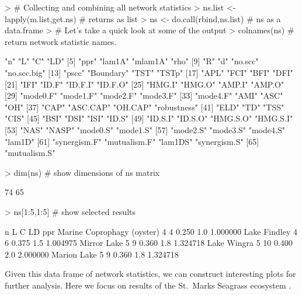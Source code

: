 \documentclass[article]{jss}
\begin{document}
\begin{Schunk}
\begin{Sinput}
> # Collecting and combining all network statistics
> ns.list <- lapply(m.list,get.ns) # returns as list
> ns <- do.call(rbind,ns.list)  # ns as a data.frame
> # Let's take a quick look at some of the output
> colnames(ns)    # return network statistic names.
\end{Sinput}
\begin{Soutput}
 [1] "n"           "L"           "C"           "LD"         
 [5] "ppr"         "lam1A"       "mlam1A"      "rho"        
 [9] "R"           "d"           "no.scc"      "no.scc.big" 
[13] "pscc"        "Boundary"    "TST"         "TSTp"       
[17] "APL"         "FCI"         "BFI"         "DFI"        
[21] "IFI"         "ID.F"        "ID.F.I"      "ID.F.O"     
[25] "HMG.I"       "HMG.O"       "AMP.I"       "AMP.O"      
[29] "mode0.F"     "mode1.F"     "mode2.F"     "mode3.F"    
[33] "mode4.F"     "AMI"         "ASC"         "OH"         
[37] "CAP"         "ASC.CAP"     "OH.CAP"      "robustness" 
[41] "ELD"         "TD"          "TSS"         "CIS"        
[45] "BSI"         "DSI"         "ISI"         "ID.S"       
[49] "ID.S.I"      "ID.S.O"      "HMG.S.O"     "HMG.S.I"    
[53] "NAS"         "NASP"        "mode0.S"     "mode1.S"    
[57] "mode2.S"     "mode3.S"     "mode4.S"     "lam1D"      
[61] "synergism.F" "mutualism.F" "lam1DS"      "synergism.S"
[65] "mutualism.S"
\end{Soutput}
\begin{Sinput}
> dim(ns)         # show dimensions of ns matrix
\end{Sinput}
\begin{Soutput}
[1] 74 65
\end{Soutput}
\begin{Sinput}
> ns[1:5,1:5]     # show selected results
\end{Sinput}
\begin{Soutput}
                           n  L     C  LD      ppr
Marine Coprophagy (oyster) 4  4 0.250 1.0 1.000000
Lake Findley               4  6 0.375 1.5 1.004975
Mirror Lake                5  9 0.360 1.8 1.324718
Lake Wingra                5 10 0.400 2.0 2.000000
Marion Lake                5  9 0.360 1.8 1.324718
\end{Soutput}
\end{Schunk}

Given this data frame of network statistics, we can construct
interesting plots for further analysis. Here we focus on results of
the St.\ Marks Seagrass ecosystem \citep{baird98}.
\end{document}
